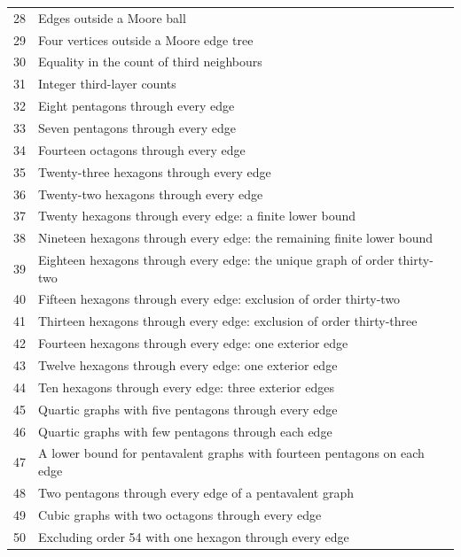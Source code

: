 \begin{longtable}{rp{}}
28 & Edges outside a Moore ball \\
29 & Four vertices outside a Moore edge tree \\
30 & Equality in the count of third neighbours \\
31 & Integer third-layer counts \\
32 & Eight pentagons through every edge \\
33 & Seven pentagons through every edge \\
34 & Fourteen octagons through every edge \\
35 & Twenty-three hexagons through every edge \\
36 & Twenty-two hexagons through every edge \\
37 & Twenty hexagons through every edge: a finite lower bound \\
38 & Nineteen hexagons through every edge: the remaining finite lower bound \\
39 & Eighteen hexagons through every edge: the unique graph of order thirty-two \\
40 & Fifteen hexagons through every edge: exclusion of order thirty-two \\
41 & Thirteen hexagons through every edge: exclusion of order thirty-three \\
42 & Fourteen hexagons through every edge: one exterior edge \\
43 & Twelve hexagons through every edge: one exterior edge \\
44 & Ten hexagons through every edge: three exterior edges \\
45 & Quartic graphs with five pentagons through every edge \\
46 & Quartic graphs with few pentagons through each edge \\
47 & A lower bound for pentavalent graphs with fourteen pentagons on each edge \\
48 & Two pentagons through every edge of a pentavalent graph \\
49 & Cubic graphs with two octagons through every edge \\
50 & Excluding order 54 with one hexagon through every edge \\
\bottomrule\end{longtable}
